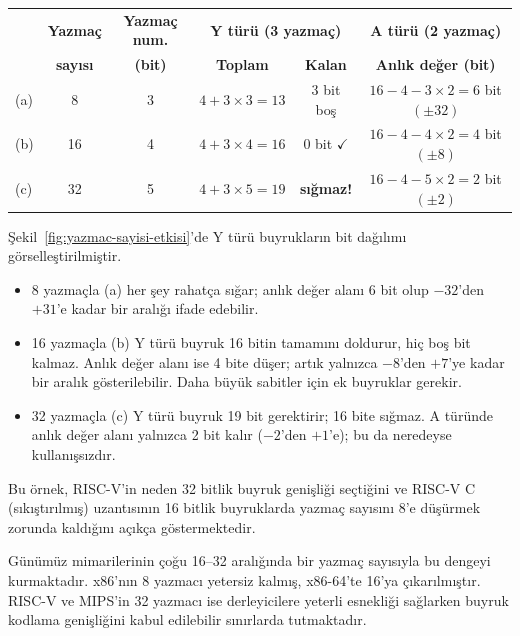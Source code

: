 \begin{ornek}[3.5]
\begin{table}[H]
\centering
\small
\begin{tabular}{lccccc}
\toprule
 & \textbf{Yazmaç} & \textbf{Yazmaç num.} & \multicolumn{2}{c}{\textbf{Y türü (3 yazmaç)}} & \textbf{A türü (2 yazmaç)} \\
 & \textbf{sayısı} & \textbf{(bit)} & \textbf{Toplam} & \textbf{Kalan} & \textbf{Anlık değer (bit)} \\
\midrule
(a) & 8  & 3 & $4 + 3\!\times\!3 = 13$ & 3 bit boş & $16 - 4 - 3\!\times\!2 = 6$ bit $(\pm 32)$ \\
(b) & 16 & 4 & $4 + 3\!\times\!4 = 16$ & 0 bit $\checkmark$ & $16 - 4 - 4\!\times\!2 = 4$ bit $(\pm 8)$ \\
(c) & 32 & 5 & $4 + 3\!\times\!5 = 19$ & \textbf{sığmaz!} & $16 - 4 - 5\!\times\!2 = 2$ bit $(\pm 2)$ \\
\bottomrule
\end{tabular}
\end{table}

Şekil~\ref{fig:yazmac-sayisi-etkisi}'de Y türü buyrukların bit dağılımı görselleştirilmiştir.
\begin{itemize}[nosep]
\item 8 yazmaçla (a) her şey rahatça sığar; anlık değer alanı 6 bit olup $-32$'den $+31$'e kadar bir aralığı ifade edebilir.
\item 16 yazmaçla (b) Y türü buyruk 16 bitin tamamını doldurur, hiç boş bit kalmaz. Anlık değer alanı ise 4 bite düşer; artık yalnızca $-8$'den $+7$'ye kadar bir aralık gösterilebilir. Daha büyük sabitler için ek buyruklar gerekir.
\item 32 yazmaçla (c) Y türü buyruk 19 bit gerektirir; 16 bite sığmaz. A türünde anlık değer alanı yalnızca 2 bit kalır ($-2$'den $+1$'e); bu da neredeyse kullanışsızdır.
\end{itemize}

Bu örnek, RISC-V'in neden 32 bitlik buyruk genişliği seçtiğini ve RISC-V C (sıkıştırılmış) uzantısının 16 bitlik buyruklarda yazmaç sayısını 8'e düşürmek zorunda kaldığını açıkça göstermektedir.
\end{ornek}

Günümüz mimarilerinin çoğu 16--32 aralığında bir yazmaç sayısıyla bu dengeyi kurmaktadır. x86'nın 8 yazmacı yetersiz kalmış, x86-64'te 16'ya çıkarılmıştır. RISC-V ve MIPS'in 32 yazmacı ise derleyicilere yeterli esnekliği sağlarken buyruk kodlama genişliğini kabul edilebilir sınırlarda tutmaktadır.

